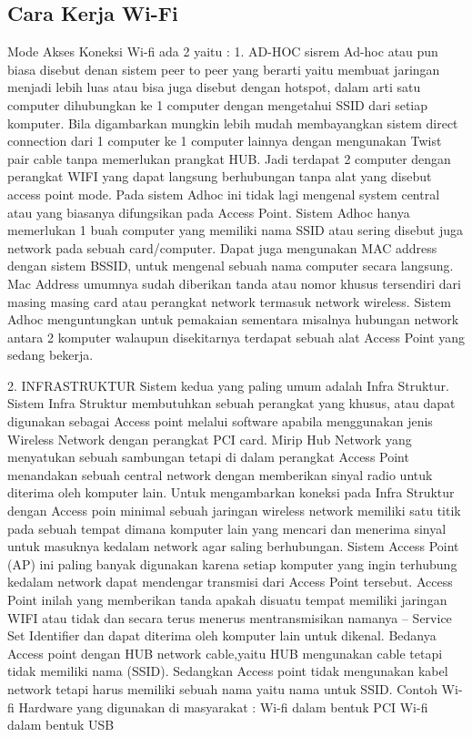 \subsection {Cara Kerja Wi-Fi}
 Mode Akses Koneksi Wi-fi ada 2 yaitu :
1. AD-HOC
sisrem Ad-hoc atau pun biasa disebut denan sistem peer to peer yang berarti yaitu membuat jaringan menjadi lebih luas atau bisa juga 
disebut dengan hotspot, dalam arti satu computer dihubungkan ke 1 computer dengan mengetahui SSID dari setiap komputer. Bila digambarkan 
mungkin lebih mudah membayangkan sistem direct connection dari 1 computer ke 1 computer lainnya dengan mengunakan Twist pair cable tanpa 
memerlukan prangkat HUB. Jadi terdapat 2 computer dengan perangkat WIFI yang dapat langsung berhubungan tanpa alat yang disebut access 
point mode. Pada sistem Adhoc ini tidak lagi mengenal system central atau yang biasanya difungsikan pada Access Point. Sistem Adhoc hanya 
memerlukan 1 buah computer yang memiliki nama SSID atau sering disebut juga network pada sebuah card/computer. Dapat juga mengunakan MAC 
address dengan sistem BSSID, untuk mengenal sebuah nama computer secara langsung. Mac Address umumnya sudah diberikan tanda atau nomor 
khusus tersendiri dari masing masing card atau perangkat network termasuk network wireless. Sistem Adhoc menguntungkan untuk pemakaian
sementara misalnya hubungan network antara 2 komputer walaupun disekitarnya terdapat sebuah alat Access Point yang sedang bekerja.

2. INFRASTRUKTUR
Sistem kedua yang paling umum adalah Infra Struktur. Sistem Infra Struktur membutuhkan sebuah perangkat yang khusus, atau dapat digunakan 
sebagai Access point melalui software apabila menggunakan jenis Wireless Network dengan perangkat PCI card. Mirip Hub Network yang 
menyatukan sebuah sambungan tetapi di dalam perangkat Access Point menandakan sebuah central network dengan memberikan sinyal 
radio untuk diterima oleh komputer lain. Untuk mengambarkan koneksi pada Infra Struktur dengan Access poin minimal 
sebuah jaringan wireless network memiliki satu titik pada sebuah tempat dimana komputer lain yang mencari dan menerima sinyal untuk masuknya 
kedalam network agar saling berhubungan. Sistem Access Point (AP) ini  paling banyak digunakan karena setiap komputer yang ingin 
terhubung kedalam network dapat mendengar transmisi dari Access Point tersebut. Access Point inilah yang memberikan
tanda apakah disuatu tempat memiliki jaringan WIFI atau tidak dan secara terus menerus mentransmisikan namanya – Service Set Identifier dan dapat diterima oleh komputer lain untuk dikenal. Bedanya Access point dengan HUB network cable,yaitu HUB mengunakan cable tetapi 
tidak memiliki nama (SSID). Sedangkan Access point tidak mengunakan kabel network tetapi harus memiliki sebuah nama yaitu nama untuk SSID.
Contoh Wi-fi Hardware yang digunakan di masyarakat : Wi-fi dalam bentuk PCI Wi-fi dalam bentuk USB


